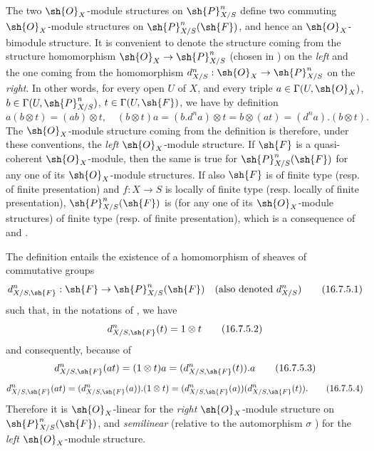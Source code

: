 \begin{env}[16.7.4]
\label{IV.16.7.4}
The two $\sh{O}_X$-module structures on $\sh{P}_{X/S}^n$ define two commuting $\sh{O}_X$-module structures on $\sh{P}_{X/S}^n(\sh{F})$, and hence an $\sh{O}_X$-bimodule structure.
It is convenient to denote the structure coming from the structure homomorphism $\sh{O}_X \to \sh{P}_{X/S}^n$ (chosen in ) on the \emph{left} and the one coming from the homomorphism $d_{X/S}^n: \sh{O}_X \to \sh{P}_{X/S}^n$ on the \emph{right}.
In other words, for every open $U$ of $X$, and every triple $a \in \Gamma(U, \sh{O}_X)$, $b \in \Gamma(U, \sh{P}_{X/S}^n)$, $t \in \Gamma(U, \sh{F})$, we have by definition
\[
  \label{IV.16.7.4.1}
  a(b \otimes t) = (ab) \otimes t, \quad (b \otimes t)a = (b.d^n a) \otimes t = b \otimes (at) = (d^na).(b \otimes t).
  \tag{16.7.4.1}
\]
The $\sh{O}_X$-module structure coming from the definition  is therefore, under these conventions, the \emph{left} $\sh{O}_X$-module structure.
If $\sh{F}$ is a quasi-coherent $\sh{O}_X$-module, then the same is true for $\sh{P}_{X/S}^n(\sh{F})$ for any one of its $\sh{O}_X$-module structures.
If also $\sh{F}$ is of finite type (resp. of finite presentation) and $f:X \to S$ is locally of finite type (resp. locally of finite presentation), $\sh{P}_{X/S}^n(\sh{F})$ is (for any one of its $\sh{O}_X$-module structures) of finite type (resp. of finite presentation), which is a consequence of  and .
\end{env}

\begin{env}[16.7.5]
\label{IV.16.7.5}
The definition  entails the existence of a homomorphism of sheaves of commutative groups
\[
  \label{IV.16.7.5.1}
  d_{X/S, \sh{F}}^n: \sh{F} \to \sh{P}_{X/S}^n(\sh{F}) \quad (\text{also denoted } d_{X/S}^n)
  \tag{16.7.5.1}
\]
such that, in the notations of , we have
\[
  \label{IV.16.7.5.2}
  d_{X/S, \sh{F}}^n(t) = 1 \otimes t
  \tag{16.7.5.2}
\]
and consequently, because of 
\[
  \label{IV.16.7.5.3}
  d_{X/S, \sh{F}}^n(at) = (1 \otimes t) a = (d_{X/S, \sh{F}}^n(t)).a
  \tag{16.7.5.3}
\]
\[
  \label{IV.16.7.5.4}
  d_{X/S, \sh{F}}^n(at) = (d_{X/S, \sh{F}}^n(a)).(1 \otimes t) = (d_{X/S, \sh{F}}^n(a))(d_{X/S, \sh{F}}^n(t)).
  \tag{16.7.5.4}
\]
Therefore it is $\sh{O}_X$-linear for the \emph{right} $\sh{O}_X$-module structure on $\sh{P}_{X/S}^n(\sh{F})$, and \emph{semilinear} (relative to the automorphism $\sigma$ ) for the \emph{left} $\sh{O}_X$-module structure.
\end{env}

